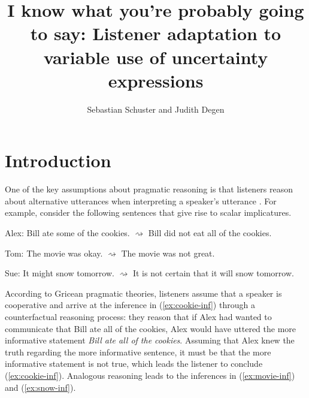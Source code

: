 \documentclass[man, floatsintext]{apa6}
\title{I know what you're probably going to say:  Listener adaptation to variable use of uncertainty expressions}
\author{Sebastian Schuster and Judith Degen}
\affiliation{Department of Linguistics, Stanford University}
\providecommand{\DIFaddbegin}{} %
\providecommand{\DIFaddend}{} %
\newcommand{\DIFaddincludegraphics}[2][]{{\color{blue}\fbox{\DIFOincludegraphics[#1]{#2}}}} %
\DeclareRobustCommand{\DIFaddbegin}{\DIFOaddbegin \let\includegraphics\DIFaddincludegraphics} %
\DeclareRobustCommand{\DIFaddend}{\DIFOaddend \let\includegraphics\DIFOincludegraphics} %
\begin{document}
\maketitle

\setcounter{secnumdepth}{3}

\DIFaddbegin 

\DIFaddend \section{Introduction}


One of the key assumptions about pragmatic reasoning is that listeners reason about alternative utterances when interpreting a speaker's utterance \parencite{Grice1975, Horn1984}. For example, consider the following sentences that give rise to scalar implicatures.

\begin{exe}
  \ex 
  \begin{xlist}
    \ex Alex: Bill ate some of the cookies.
    \ex \label{ex:cookie-inf} $\rightsquigarrow$ Bill did not eat all of the cookies.
  \end{xlist}
  \ex 
  \begin{xlist} 
    \ex Tom: The movie was okay.
    \ex \label{ex:movie-inf} $\rightsquigarrow$  The movie was not great.
  \end{xlist}
  \ex 
  \begin{xlist} 
    \ex Sue: It might snow tomorrow.
    \ex \label{ex:snow-inf} $\rightsquigarrow$  It is not certain that it will snow tomorrow.
  \end{xlist}
\end{exe}
According to Gricean pragmatic theories, listeners assume that a speaker is cooperative and arrive at the inference in (\ref{ex:cookie-inf}) through a counterfactual reasoning process: they reason that if Alex had wanted to communicate that Bill ate all of the cookies, Alex would have uttered the more informative statement \textit{Bill ate all of the cookies}. Assuming that Alex knew the truth regarding the more informative sentence, it must be that the more informative statement is not true, which leads the listener to conclude (\ref{ex:cookie-inf}). Analogous reasoning leads to the inferences in (\ref{ex:movie-inf})  and (\ref{ex:snow-inf}).
\end{document}
